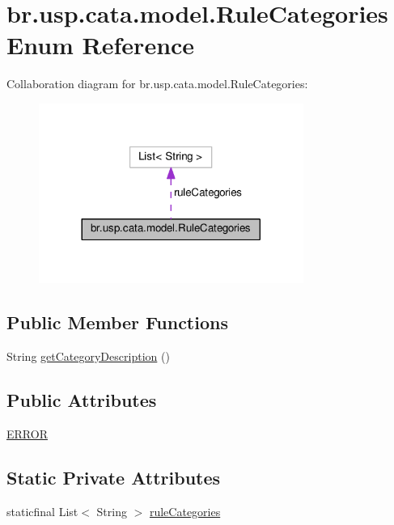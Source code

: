 \hypertarget{enumbr_1_1usp_1_1cata_1_1model_1_1_rule_categories}{\section{br.\+usp.\+cata.\+model.\+Rule\+Categories Enum Reference}
\label{enumbr_1_1usp_1_1cata_1_1model_1_1_rule_categories}
}


Collaboration diagram for br.\+usp.\+cata.\+model.\+Rule\+Categories\+:\nopagebreak
\begin{figure}[H]
\begin{center}
\leavevmode
\includegraphics[width=245pt]{enumbr_1_1usp_1_1cata_1_1model_1_1_rule_categories__coll__graph}
\end{center}
\end{figure}
\subsection*{Public Member Functions}
\begin{DoxyCompactItemize}
\item 
String \hyperlink{enumbr_1_1usp_1_1cata_1_1model_1_1_rule_categories_adb173aceef583fe27cea4fccd682f892}{get\+Category\+Description} ()
\end{DoxyCompactItemize}
\subsection*{Public Attributes}
\begin{DoxyCompactItemize}
\item 
\hyperlink{enumbr_1_1usp_1_1cata_1_1model_1_1_rule_categories_a31996cb0e5642710b29dc88f5495a738}{E\+R\+R\+O\+R}
\end{DoxyCompactItemize}
\subsection*{Static Private Attributes}
\begin{DoxyCompactItemize}
\item 
staticfinal List$<$ String $>$ \hyperlink{enumbr_1_1usp_1_1cata_1_1model_1_1_rule_categories_abbf38679d4fb70dd7eec1ea86f346f58}{rule\+Categories}
\end{DoxyCompactItemize}


